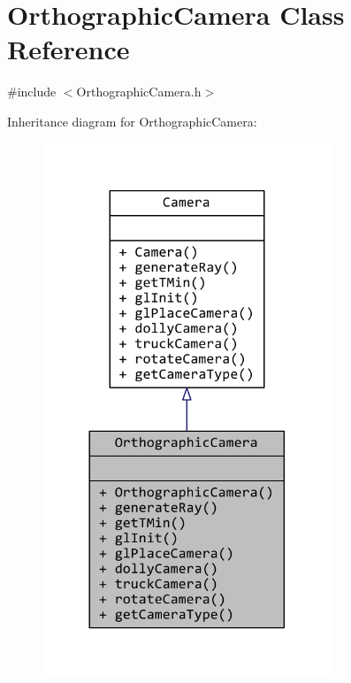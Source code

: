 \hypertarget{classOrthographicCamera}{\section{Orthographic\+Camera Class Reference}
\label{classOrthographicCamera}
}


{\ttfamily \#include $<$Orthographic\+Camera.\+h$>$}



Inheritance diagram for Orthographic\+Camera\+:
\nopagebreak
\begin{figure}[H]
\begin{center}
\leavevmode
\includegraphics[width=245pt]{classOrthographicCamera__inherit__graph}
\end{center}
\end{figure}


